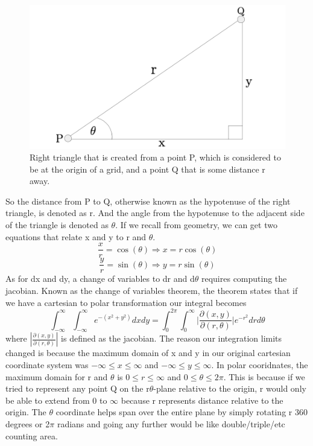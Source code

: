 \documentclass{article}
\newcommand{\be}{\begin{equation}}
\newcommand{\ee}{\end{equation}}
\begin{document}
\begin{figure}[h]
  \centering
  \includegraphics[scale=0.3]{figures/Triangle.png}
    \caption{Right triangle that is created from a point P, which is considered to be at the origin of a grid, and a point Q that is some distance r away.}
  \label{fig:triangle}
\end{figure}
So the distance from P to Q, otherwise known as the hypotenuse of the right triangle, is denoted as r.
And the angle from the hypotenuse to the adjacent side of the triangle is denoted as $\theta$.
If we recall from geometry, we can get two equations that relate x and y to r and $\theta$.
\be
\frac{x}{r} = \cos(\theta) \Rightarrow x = r \cos(\theta)
\ee
\be
\frac{y}{r} = \sin(\theta) \Rightarrow y = r \sin(\theta)
\ee
As for dx and dy, a change of variables to dr and d$\theta$ requires computing the jacobian.
Known as the change of variables theorem, the theorem states that if we have a cartesian to polar transformation our integral becomes
\be
\int_{-\infty}^\infty \int_{-\infty}^\infty e^{-(x^2 + y^2)} dxdy = \int_{0}^{2 \pi} \int_{0}^{\infty} \Big| \frac{\partial(x,y)}{\partial(r,\theta)} \Big | e^{-r^2} dr d\theta
\ee
where $| \frac{\partial(x,y)}{\partial(r,\theta)} |$ is defined as the jacobian.
The reason our integration limits changed is because the maximum domain of x and y in our original cartesian coordinate system was $- \infty \leq x \leq \infty$ and $- \infty \leq y \leq \infty$.
In polar cooridnates, the maximum domain for r and $\theta$ is $0 \leq r \leq \infty$ and $0 \leq \theta \leq 2 \pi$.
This is because if we tried to represent any point Q on the r$\theta$-plane relative to the origin, r would only be able to extend from 0 to $\infty$ because r represents distance relative to the origin.
The $\theta$ coordinate helps span over the entire plane by simply rotating r 360 degrees or 2$\pi$ radians and going any further would be like double/triple/etc counting area.
\end{document}
